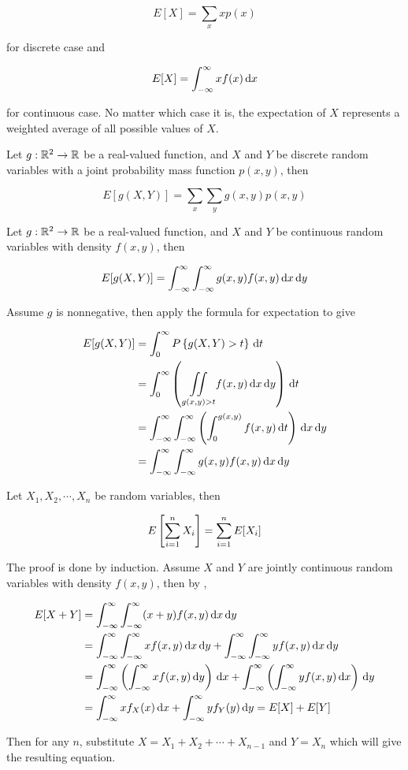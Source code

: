 \documentclass[a4paper,12pt]{article}
\begin{document}
$$E[X]=\sum_{x}xp(x)$$\s

for discrete case and

$$E[X]=\int_{-\infty}^{\infty}xf(x)\,\mathrm{d} x$$\s

for continuous case. No matter which case it is, the expectation of $X$ represents a weighted average of all possible values of $X$.\n

\begin{pst}
  Let $g:\mathbb{R}^{2}\to\mathbb{R}$ be a real-valued function, and $X$ and $Y$ be discrete random variables with a joint probability mass function $p(x,y)$, then

  $$E[g(X,Y)]=\sum_{x}\sum_{y}g(x,y)p(x,y)$$
\end{pst}\n

\begin{pst}
  Let $g:\mathbb{R}^{2}\to\mathbb{R}$ be a real-valued function, and $X$ and $Y$ be continuous random variables with density $f(x,y)$, then

  $$E[g(X,Y)]=\int_{-\infty}^{\infty}\int_{-\infty}^{\infty}g(x,y)f(x,y)\,\mathrm{d} x\,\mathrm{d} y$$\s

  \prf Assume $g$ is nonnegative, then apply the formula for expectation to give

  $$\begin{aligned}[t]
    E[g(X,Y)]&=\int_{0}^{\infty}P\left\{ g(X,Y)>t\right\}\,\mathrm{d} t\\
    &=\int_{0}^{\infty}\left( \underset{g(x,y)>t}{\iint}f(x,y)\,\mathrm{d} x\,\mathrm{d} y\right)\,\mathrm{d} t\\
    &=\int_{-\infty}^{\infty}\int_{-\infty}^{\infty}\left( \int_{0}^{g(x,y)}f(x,y)\,\mathrm{d} t\right)\,\mathrm{d} x\,\mathrm{d} y\\
    &=\int_{-\infty}^{\infty}\int_{-\infty}^{\infty}g(x,y)f(x,y)\,\mathrm{d} x\,\mathrm{d} y
  \end{aligned}$$
\end{pst}\n

\begin{crl}
  Let $X_{1},X_{2},\cdots,X_{n}$ be random variables, then

  $$E\left[ \sum_{i=1}^{n}X_{i}\right]=\sum_{i=1}^{n}E[X_{i}]$$\s

  \prf The proof is done by induction. Assume $X$ and $Y$ are jointly continuous random variables with density $f(x,y)$, then by \rpst[\sctr{0}],

  $$\begin{aligned}[t]
    E[X+Y]&=\int_{-\infty}^{\infty}\int_{-\infty}^{\infty}(x+y)f(x,y)\,\mathrm{d} x\,\mathrm{d} y\\
    &=\int_{-\infty}^{\infty}\int_{-\infty}^{\infty}xf(x,y)\,\mathrm{d} x\,\mathrm{d} y+\int_{-\infty}^{\infty}\int_{-\infty}^{\infty}yf(x,y)\,\mathrm{d} x\,\mathrm{d} y\\
    &=\int_{-\infty}^{\infty}\left( \int_{-\infty}^{\infty}xf(x,y)\,\mathrm{d} y\right)\,\mathrm{d} x+\int_{-\infty}^{\infty}\left( \int_{-\infty}^{\infty}yf(x,y)\,\mathrm{d} x\right)\,\mathrm{d} y\\
    &=\int_{-\infty}^{\infty}xf_{X}(x)\,\mathrm{d} x+\int_{-\infty}^{\infty}yf_{Y}(y)\,\mathrm{d} y=E[X]+E[Y]
  \end{aligned}$$\s

  Then for any $n$, substitute $X=X_{1}+X_{2}+\cdots+X_{n-1}$ and $Y=X_{n}$ which will give the resulting equation.
\end{crl}
\end{document}
